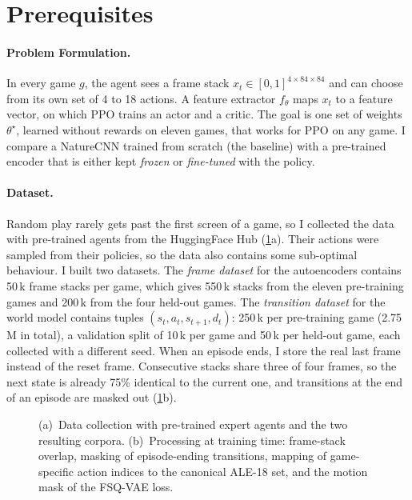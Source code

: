 \documentclass[runningheads]{llncs}
\begin{document}
\section{Prerequisites}
\label{sec:prereq}

\paragraph{Problem Formulation.} In every game $g$, the agent sees a frame stack
$x_t\in[0,1]^{4\times84\times84}$ and can choose from its own set of 4 to 18 actions. A feature
extractor $f_\theta$ maps $x_t$ to a feature vector, on which PPO trains an actor and a critic.
The goal is one set of weights $\theta^\star$, learned without rewards on eleven games, that
works for PPO on any game. I compare a NatureCNN trained from scratch (the baseline) with a
pre-trained encoder that is either kept \emph{frozen} or \emph{fine-tuned} with the policy.

\paragraph{Dataset.} Random play rarely gets past the first screen of a game, so I collected
the data with pre-trained agents from the HuggingFace Hub (\cref{fig:data}a). Their actions were
sampled from their policies, so the data also contains some sub-optimal behaviour. I built
two datasets. The \emph{frame dataset} for the
autoencoders contains 50\,k frame stacks per game, which gives 550\,k stacks from the eleven
pre-training games and 200\,k from the four held-out games. The \emph{transition dataset} for
the world model contains tuples $(s_t,a_t,s_{t+1},d_t)$: 250\,k per pre-training game (2.75\,M in
total), a validation split of 10\,k per game and 50\,k per held-out game, each collected with a
different seed. When an episode ends, I store the real last frame instead of the reset frame.
Consecutive stacks share three of four frames, so the next state is already 75\% identical to
the current one, and transitions at the end of an episode are masked out (\cref{fig:data}b).

\begin{figure}[t]
\centering

\caption{(a)~Data collection with pre-trained expert agents and the two resulting corpora.
(b)~Processing at training time: frame-stack overlap, masking of episode-ending
transitions, mapping of game-specific action indices to the canonical ALE-18 set, and the
motion mask of the FSQ-VAE loss.}
\label{fig:data}
\end{figure}
\end{document}
